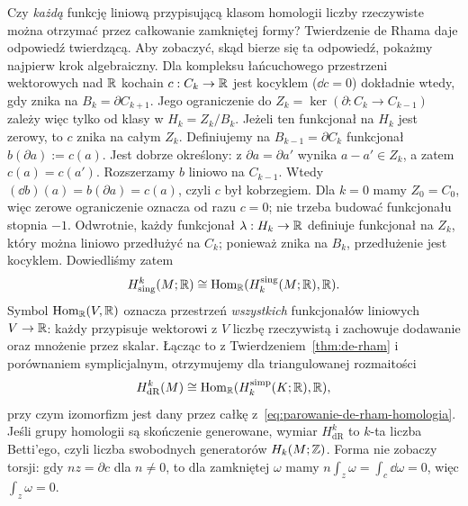 Czy \emph{każdą} funkcję liniową przypisującą
klasom homologii liczby rzeczywiste można
otrzymać przez całkowanie zamkniętej formy?
Twierdzenie de Rhama daje odpowiedź twierdzącą.
Aby zobaczyć, skąd bierze się ta odpowiedź,
pokażmy najpierw krok algebraiczny.
Dla kompleksu
łańcuchowego przestrzeni wektorowych nad $\mathbb{R}$
kochain $c:C_k\to\mathbb{R}$ jest kocyklem
($\dd c=0$) dokładnie wtedy, gdy znika
na $B_k=\partial C_{k+1}$. Jego ograniczenie
do $Z_k=\ker(\partial:C_k\to C_{k-1})$ zależy
więc tylko od klasy w $H_k=Z_k/B_k$.
Jeżeli ten funkcjonał na $H_k$ jest zerowy,
to $c$ znika na całym $Z_k$. Definiujemy
na $B_{k-1}=\partial C_k$ funkcjonał
$b(\partial a):=c(a)$. Jest dobrze określony:
z $\partial a=\partial a'$ wynika
$a-a'\in Z_k$, a zatem $c(a)=c(a')$.
Rozszerzamy $b$ liniowo na $C_{k-1}$.
Wtedy $(\dd b)(a)=b(\partial a)=c(a)$,
czyli $c$ był kobrzegiem. Dla $k=0$ mamy
$Z_0=C_0$, więc zerowe ograniczenie oznacza od razu $c=0$;
nie trzeba budować funkcjonału stopnia $-1$.
Odwrotnie, każdy
funkcjonał $\lambda:H_k\to\mathbb{R}$ definiuje
funkcjonał na $Z_k$, który można liniowo
przedłużyć na $C_k$; ponieważ znika na
$B_k$, przedłużenie jest kocyklem.
Dowiedliśmy zatem
\[
 H^k_{\mathrm{sing}}(M;\mathbb{R})
 \cong \operatorname{Hom}_{\mathbb{R}}
       (H_k^{\mathrm{sing}}(M;\mathbb{R}),\mathbb{R}).
\]
Symbol $\operatorname{Hom}_{\mathbb{R}}(V,\mathbb{R})$ oznacza
przestrzeń \emph{wszystkich} funkcjonałów liniowych
$V\to\mathbb{R}$: każdy przypisuje wektorowi z $V$
liczbę rzeczywistą i zachowuje dodawanie
oraz mnożenie przez skalar.
Łącząc to z Twierdzeniem~\ref{thm:de-rham}
i porównaniem symplicjalnym, otrzymujemy
dla triangulowanej rozmaitości
\begin{equation}\label{eq:porownanie-simp-de-rham}
 H^k_{\mathrm{dR}}(M)
 \cong \operatorname{Hom}_{\mathbb{R}}
       (H_k^{\mathrm{simp}}(K;\mathbb{R}),\mathbb{R}),
\end{equation}
przy czym izomorfizm jest dany przez całkę
z~\eqref{eq:parowanie-de-rham-homologia}.
Jeśli grupy homologii są skończenie generowane,
wymiar $H^k_{\mathrm{dR}}$ to $k$-ta liczba
Betti'ego, czyli liczba swobodnych generatorów
$H_k(M;\mathbb{Z})$. Forma nie zobaczy torsji: gdy
$nz=\partial c$ dla $n\ne0$, to dla zamkniętej
$\omega$ mamy
$n\int_z\omega=\int_c\dd\omega=0$,
więc $\int_z\omega=0$.

